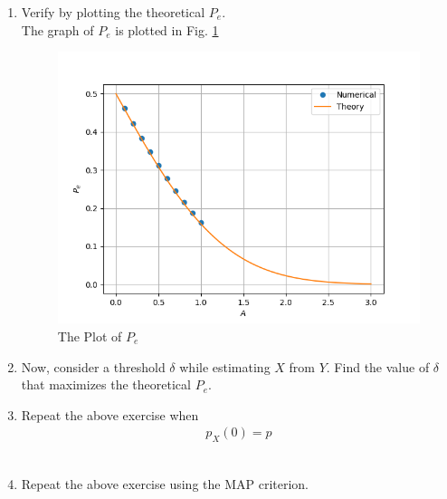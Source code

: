 \documentclass[journal,12pt,twocolumn]{IEEEtran}
\renewcommand\thesection{\arabic{section}}
\begin{document}
\begin{enumerate}[label=\thesection.\arabic*
    ,ref=\thesection.\theenumi]
Therefore, 
\begin{align}
    P_e &= P_{e|0} \times \pr{X=1} + P_{e|1} \times \pr{X=-1} \\
    &= \frac{1}{2} P_{e|0} + \frac{1}{2} P_{e|1} \\
    &= \frac{1}{2} Q_N(A) + \frac{1}{2} Q_N(A) \\
    &= Q_N(A)
\end{align}


\item
Verify by plotting  the theoretical $P_e$.  
\\
\solution
The graph of $P_e$ is plotted in Fig. \ref{fig:errorgraph}  

\begin{figure}
    \centering
    \includegraphics[width=\columnwidth]{./figures/ErrorGraph.png}
    \caption{The Plot of $P_e$}
    \label{fig:errorgraph}
    \end{figure}



\item Now, consider a threshold $\delta$  while estimating $X$ from $Y$. Find the value of $\delta$ that maximizes the theoretical $P_e$.
\\
\solution




\item Repeat the above exercise when 
    \begin{align}
        p_{X}(0) = p
    \end{align}
\\
\solution



    \item Repeat the above exercise using the MAP criterion.
\\
\solution


\end{enumerate}
\end{document}
